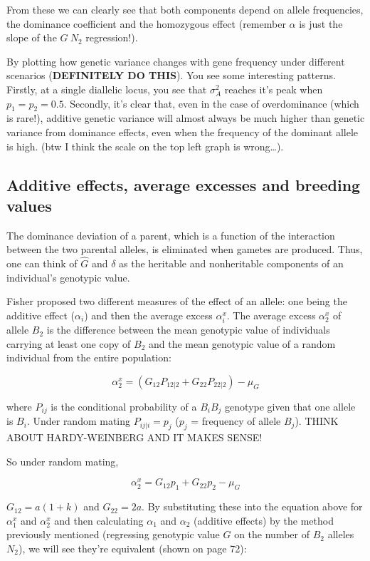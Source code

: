 \documentclass[
]{article}
\begin{document}
From these we can clearly see that both components depend on allele
frequencies, the dominance coefficient and the homozygous effect
(remember \(\alpha\) is just the slope of the \(G ~ N_2\) regression!).

By plotting how genetic variance changes with gene frequency under
different scenarios (\textbf{DEFINITELY DO THIS}). You see some
interesting patterns. Firstly, at a single diallelic locus, you see that
\(\sigma^2_A\) reaches it's peak when \(p_1 = p_2 = 0.5\). Secondly,
it's clear that, even in the case of overdominance (which is rare!),
additive genetic variance will almost always be much higher than genetic
variance from dominance effects, even when the frequency of the dominant
allele is high. (btw I think the scale on the top left graph is
wrong\ldots).

\hypertarget{additive-effects-average-excesses-and-breeding-values}{%
\subsection{Additive effects, average excesses and breeding
values}\label{additive-effects-average-excesses-and-breeding-values}}

The dominance deviation of a parent, which is a function of the
interaction between the two parental alleles, is eliminated when gametes
are produced. Thus, one can think of \(\hat{G}\) and \(\delta\) as the
heritable and nonheritable components of an individual's genotypic
value.

Fisher proposed two different measures of the effect of an allele: one
being the additive effect (\(\alpha_i\)) and then the average excess
\(\alpha^x_i\). The average excess \(\alpha^x_2\) of allele \(B_2\) is
the difference between the mean genotypic value of individuals carrying
at least one copy of \(B_2\) and the mean genotypic value of a random
individual from the entire population:

\[ \alpha^x_2 = (G_{12}P_{12|2} + G_{22}P_{22|2}) - \mu_G \]

where \(P_{ij}\) is the conditional probability of a \(B_iB_j\) genotype
given that one allele is \(B_i\). Under random mating \(P_{ij|i} = p_j\)
(\(p_j\) = frequency of allele \(B_j\)). THINK ABOUT HARDY-WEINBERG AND
IT MAKES SENSE!

So under random mating,

\[ \alpha^x_2 = G_{12}p_1 + G_{22}p_2 - \mu_G \]

\(G_{12} = a(1+k)\) and \(G_{22} = 2a\). By substituting these into the
equation above for \(\alpha^x_1\) and \(\alpha^x_2\) and then
calculating \(\alpha_1\) and \(\alpha_2\) (additive effects) by the
method previously mentioned (regressing genotypic value \(G\) on the
number of \(B_2\) alleles \(N_2\)), we will see they're equivalent
(shown on page 72):
\end{document}
